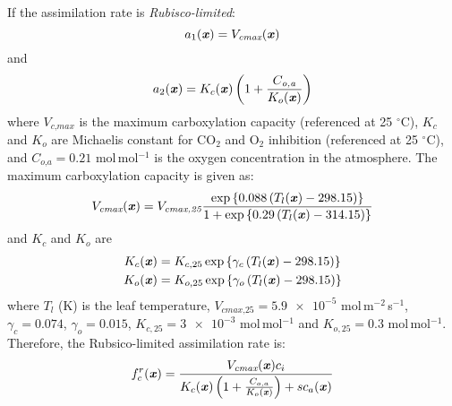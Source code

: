 If the assimilation rate is \textit{Rubisco-limited}:
\begin{equation}
a_1(\textbf{\textit{x}}) = V_{\textit{cmax}}(\textbf{\textit{x}})
\end{equation} 
and
\begin{equation}
a_2(\textbf{\textit{x}}) = K_c(\textbf{\textit{x}})\left(1 + \frac{C_{\textit{o,a}}}{K_o(\textbf{\textit{x}})}\right)
\end{equation} 
where $V_{\textit{c,max}}$ is the maximum carboxylation capacity (referenced at 25 $^{\circ}$C), $K_c$ and $K_o$ are Michaelis constant for CO$_2$ and O$_2$ inhibition (referenced at 25 $^{\circ}$C), and $C_{\textit{o,a}} = 0.21$ mol\,mol$^{-1}$ is the oxygen concentration in the atmosphere. The maximum carboxylation capacity is given as:
\begin{equation}
V_{\textit{cmax}}(\textbf{\textit{x}}) = V_{\textit{cmax,25}} \frac{ \exp\left\{ 0.088 \left(T_l(\textbf{\textit{x}}) - 298.15\right)\right\} }{1 + \exp\left\{0.29\left(T_l(\textbf{\textit{x}}) - 314.15\right)\right\} }
\end{equation}
and $K_c$ and $K_o$ are
\begin{align}
K_c(\textbf{\textit{x}}) &= K_{c,25} \exp\left\{ \gamma_c \left(T_l(\textbf{\textit{x}}) - 298.15\right)\right\} \\
K_o(\textbf{\textit{x}}) &= K_{o,25} \exp\left\{ \gamma_o \left(T_l(\textbf{\textit{x}}) - 298.15\right)\right\}
\end{align}
where $T_l$ (K) is the leaf temperature, $V_{\textit{cmax,25}} = \num{5.9e-5}$ mol\,m$^{-2}$\,s$^{-1}$,
$\gamma_c = 0.074$, $\gamma_o = 0.015$, $K_{c,25} = \num{3e-3}$ mol\,mol$^{-1}$ and $K_{o,25} = 0.3$ mol\,mol$^{-1}$. Therefore, the Rubsico-limited assimilation rate is:
\begin{equation}
f_c^r(\textbf{\textit{x}}) = \frac{V_{\textit{cmax}}(\textbf{\textit{x}}) c_i}{K_c(\textbf{\textit{x}}) \left(1 + \frac{C_{o,a}}{K_o(\textbf{\textit{x}})}\right) + s c_a(\textbf{\textit{x}})}
\end{equation}

